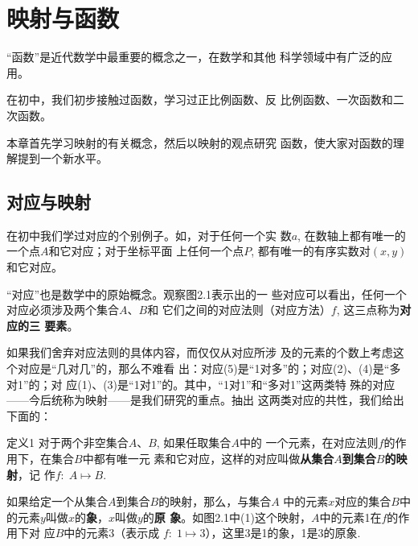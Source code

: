 \chapter{映射与函数}

“函数”是近代数学中最重要的概念之一，在数学和其他
科学领域中有广泛的应用。

在初中，我们初步接触过函数，学习过正比例函数、反
比例函数、一次函数和二次函数。

本章首先学习映射的有关概念，然后以映射的观点研究
函数，使大家对函数的理解提到一个新水平。

\section{对应与映射}
在初中我们学过对应的个别例子。如，对于任何一个实
数$a$, 在数轴上都有唯一的一个点$A$和它对应；对于坐标平面
上任何一个点$P$, 都有唯一的有序实数对$(x,y)$和它对应。

“对应”也是数学中的原始概念。观察图2.1表示出的一
些对应可以看出，任何一个对应必须涉及两个集合$A$、$B$和
它们之间的对应法则（对应方法）$f$, 这三点称为\textbf{对应的三
要素}。

如果我们舍弃对应法则的具体内容，而仅仅从对应所涉
及的元素的个数上考虑这个对应是“几对几”的，那么不难看
出：对应(5)是“1对多”的；对应(2)、(4)是“多对1”的；对
应(1)、(3)是“1对1”的。其中，“1对1”和“多对1”这两类特
殊的对应——今后统称为映射——是我们研究的重点。抽出
这两类对应的共性，我们给出下面的：

\begin{thm}{定义1 }
    对于两个非空集合$A$、$B$, 如果任取集合$A$中的
一个元素，在对应法则$f$的作用下，在集合$B$中都有唯一元
素和它对应，这样的对应叫做\textbf{从集合$A$到集合$B$的映射}，记
作$f:\; A\mapsto  B$.
\end{thm}

如果给定一个从集合$A$到集合$B$的映射，那么，与集合$A$
中的元素$x$对应的集合$B$中的元素$y$叫做$x$的\textbf{象}，$x$叫做$y$的\textbf{原
象}。如图2.1中(1)这个映射，$A$中的元素1在$f$的作用下对
应$B$中的元素3（表示成
$f:\; 1\mapsto  3$），这里3是1的象，1是3的原象.

